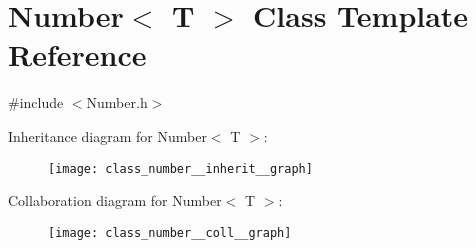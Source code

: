 \hypertarget{class_number}{}\section{Number$<$ T $>$ Class Template Reference}
\label{class_number}


{\ttfamily \#include $<$Number.\+h$>$}



Inheritance diagram for Number$<$ T $>$\+:
\nopagebreak
\begin{figure}[H]
\begin{center}
\leavevmode
\texttt{[image: class\_number\_\_inherit\_\_graph]}
\end{center}
\end{figure}


Collaboration diagram for Number$<$ T $>$\+:
\nopagebreak
\begin{figure}[H]
\begin{center}
\leavevmode
\texttt{[image: class\_number\_\_coll\_\_graph]}
\end{center}
\end{figure}

